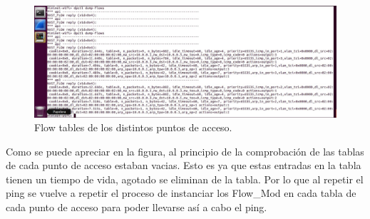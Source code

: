 \begin{figure}[!htb]
  \centering
    \includegraphics[width=\linewidth]{./img/test/17.JPG}
    \caption{Flow tables de los distintos puntos de acceso.}
  \label{fig:yo}
\end{figure}
\newline
Como se puede apreciar en la figura, al principio de la comprobación de las tablas de cada punto de acceso estaban vacias. Esto es ya que estas entradas en la tabla tienen un tiempo de vida, agotado se eliminan de la tabla. Por lo que al repetir el ping se vuelve a repetir el proceso de instanciar los Flow\_Mod en cada tabla de cada punto de acceso para poder llevarse así a cabo el ping. \newline
\newline

